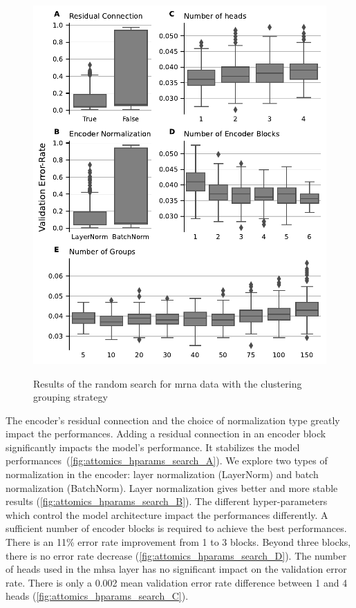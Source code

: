 \documentclass[../main.tex]{subfiles}
\begin{document}
	 \begin{figure}[htbp]
		 \centering
		 \begin{subcaptiongroup}
			 \includegraphics[width=0.9\linewidth]{Beaude.168.fig.2.pdf}
			 \label{fig:attomics_hparams_search_A}
			 \label{fig:attomics_hparams_search_B}
			 \label{fig:attomics_hparams_search_C}
			 \label{fig:attomics_hparams_search_D}
			 \label{fig:attomics_hparams_search_E}
		 \end{subcaptiongroup}
		 \caption{Results of the random search for \gls{mrna} data with the clustering grouping strategy}\label{fig:hparams_search}
	 \end{figure}

	 The encoder's residual connection and the choice of normalization type greatly impact the performances.
	 Adding a residual connection in an encoder block significantly impacts the model's performance.
	 It stabilizes the model performances~(\cref{fig:attomics_hparams_search_A}).
	 We explore two types of normalization in the encoder: layer normalization (LayerNorm) and batch normalization (BatchNorm).
	 Layer normalization gives better and more stable results (\cref{fig:attomics_hparams_search_B}).
	 The different hyper-parameters which control the model architecture impact the performances differently.
	 A sufficient number of encoder blocks is required to achieve the best performances.
	 There is an 11\% error rate improvement from 1 to 3 blocks.
	 Beyond three blocks, there is no error rate decrease (\cref{fig:attomics_hparams_search_D}).
	 The number of heads used in the \gls{mhsa} layer has no significant impact on the validation error rate.
	 There is only a 0.002 mean validation error rate difference between 1 and 4 heads (\cref{fig:attomics_hparams_search_C}).
\end{document}
